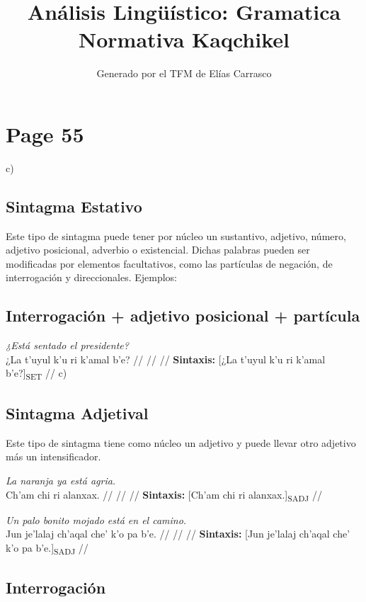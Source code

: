 \documentclass{article}%
\title{Análisis Lingüístico: Gramatica Normativa Kaqchikel}%
\author{Generado por el TFM de Elías Carrasco}%
\begin{document}
%
\normalsize%
\maketitle%
\section{Page 55}%
\label{sec:Page55}%
c) %
\subsection{Sintagma Estativo}%
\label{subsec:SintagmaEstativo}%

%
Este tipo de sintagma puede tener por núcleo un sustantivo, adjetivo, número, adjetivo %
posicional, adverbio o existencial. Dichas palabras pueden ser modificadas por %
elementos facultativos, como las partículas de negación, de interrogación y direccionales. %
Ejemplos: %
\subsection{Interrogación + adjetivo posicional + partícula}%
\label{subsec:Interrogacin+adjetivoposicional+partcula}%

%
\par\medskip%
\ex
\textit{¿Está sentado el presidente?} \\
\begingl
\gla ¿La t’uyul k’u ri k’amal b'e? //
\glb  //
\glc  //
\glft \textbf{Sintaxis:} [¿La t’uyul k’u ri k’amal b'e?]\textsubscript{SET} //
\endgl
\xe
%
\medskip%
c) %
\subsection{Sintagma Adjetival}%
\label{subsec:SintagmaAdjetival}%

%
Este tipo de sintagma tiene como núcleo un adjetivo y puede llevar otro adjetivo más un %
intensificador. %
\par\medskip%
\ex
\textit{La naranja ya está agria.} \\
\begingl
\gla Ch'am chi ri alanxax. //
\glb  //
\glc  //
\glft \textbf{Sintaxis:} [Ch'am chi ri alanxax.]\textsubscript{SADJ} //
\endgl
\xe
%
\medskip%
\par\medskip%
\ex
\textit{Un palo bonito mojado está en el camino.} \\
\begingl
\gla Jun je’lalaj ch’aqal che' k'o pa b'e. //
\glb  //
\glc  //
\glft \textbf{Sintaxis:} [Jun je’lalaj ch’aqal che' k'o pa b'e.]\textsubscript{SADJ} //
\endgl
\xe
%
\medskip%
\subsection{Interrogación}%
\label{subsec:Interrogacin}%
\end{document}

